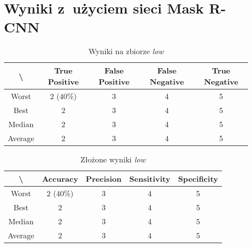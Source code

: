 
\section{Wyniki z~użyciem sieci Mask R-CNN}

\begin{table}[!h]
	\centering
	\caption{Wyniki na zbiorze \textit{low}}
	\vspace{6pt}
	{\footnotesize
		\begin{tabular}{|c|c|c|c|c|}
			\hline \textbackslash & True Positive & False Positive & False Negative & True Negative \\
      \hline Worst & 2 (40\%) & 3 & 4 & 5 \\
      \hline Best & 2 & 3 & 4 & 5 \\
      \hline Median & 2 & 3 & 4 & 5 \\
      \hline Average & 2 & 3 & 4 & 5 \\
      \hline
		\end{tabular}
	}
	\vspace{0pt}
\end{table}

\vspace{1cm}

\begin{table}[!h]
	\centering
	\caption{Złożone wyniki \textit{low}}
	\vspace{6pt}
	{\footnotesize
		\begin{tabular}{|c|c|c|c|c|}
			\hline \textbackslash & Accuracy & Precision & Sensitivity & Specificity \\
      \hline Worst & 2 (40\%) & 3 & 4 & 5 \\
      \hline Best & 2 & 3 & 4 & 5 \\
      \hline Median & 2 & 3 & 4 & 5 \\
      \hline Average & 2 & 3 & 4 & 5 \\
      \hline
		\end{tabular}
	}
	\vspace{0pt}
\end{table}


